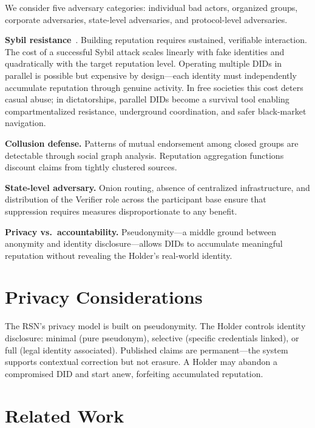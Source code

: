 \documentclass[11pt,a4paper,twocolumn]{article}
\begin{document}
We consider five adversary categories: individual bad actors, organized groups, corporate adversaries, state-level adversaries, and protocol-level adversaries.

\textbf{Sybil resistance}~\cite{douceur2002}. Building reputation requires sustained, verifiable interaction. The cost of a successful Sybil attack scales linearly with fake identities and quadratically with the target reputation level. Operating multiple DIDs in parallel is possible but expensive by design---each identity must independently accumulate reputation through genuine activity. In free societies this cost deters casual abuse; in dictatorships, parallel DIDs become a survival tool enabling compartmentalized resistance, underground coordination, and safer black-market navigation.

\textbf{Collusion defense.} Patterns of mutual endorsement among closed groups are detectable through social graph analysis. Reputation aggregation functions discount claims from tightly clustered sources.

\textbf{State-level adversary.} Onion routing, absence of centralized infrastructure, and distribution of the Verifier role across the participant base ensure that suppression requires measures disproportionate to any benefit.

\textbf{Privacy vs.\ accountability.} Pseudonymity---a middle ground between anonymity and identity disclosure---allows DIDs to accumulate meaningful reputation without revealing the Holder's real-world identity.

\section{Privacy Considerations}

The RSN's privacy model is built on pseudonymity. The Holder controls identity disclosure: minimal (pure pseudonym), selective (specific credentials linked), or full (legal identity associated). Published claims are permanent---the system supports contextual correction but not erasure. A Holder may abandon a compromised DID and start anew, forfeiting accumulated reputation.

\section{Related Work}
\end{document}
